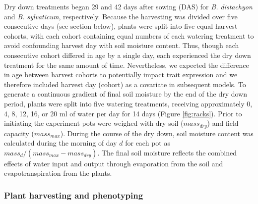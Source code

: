 \documentclass[jou,floatsintext]{apa6}
\begin{document}
Dry down treatments began 29 and 42 days after sowing (DAS) for \emph{B. distachyon} and \emph{B. sylvaticum}, respectively. Because the harvesting was divided over five consecutive days (see section below), plants were split into five equal harvest cohorts, with each cohort containing equal numbers of each watering treatment to avoid confounding harvest day with soil moisture content. Thus, though each consecutive cohort differed in age by a single day, each experienced the dry down treatment for the same amount of time. Nevertheless, we expected the difference in age between harvest cohorts to potentially impact trait expression and we therefore included harvest day (cohort) as a covariate in subsequent models. To generate a continuous gradient of final soil moisture by the end of the dry down period, plants were split into five watering treatments, receiving approximately 0, 4, 8, 12, 16, or 20 ml of water per day for 14 days (Figure \ref{fig:racks}). Prior to initiating the experiment pots were weighed with dry soil (\(mass_{dry}\)) and field capacity (\(mass_{max}\)). During the course of the dry down, soil moisture content was calculated during the morning of day \(d\) for each pot as \(mass_d/(mass_{max}-mass_{dry})\). The final soil moisture reflects the combined effects of water input and output through evaporation from the soil and evapotranspiration from the plants.

\hypertarget{plant-harvesting-and-phenotyping}{%
\subsubsection{Plant harvesting and phenotyping}\label{plant-harvesting-and-phenotyping}}
\end{document}
